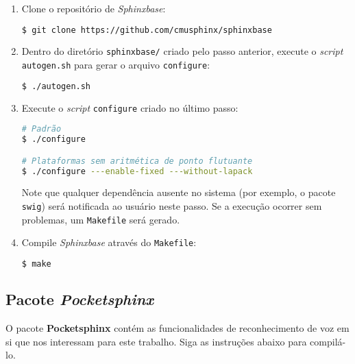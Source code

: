 \begin{enumerate}
\item Clone o repositório de \textit{Sphinxbase}:

\begin{lstlisting}[language=Bash]
$ git clone https://github.com/cmusphinx/sphinxbase
\end{lstlisting}

\item Dentro do diretório \texttt{sphinxbase/} criado pelo passo anterior, execute o \textit{script} \texttt{autogen.sh} para gerar o arquivo \texttt{configure}:

\begin{lstlisting}[language=Bash]
$ ./autogen.sh
\end{lstlisting}

\item Execute o \textit{script} \texttt{configure} criado no último passo:

\begin{lstlisting}[language=Bash]
# Padrão
$ ./configure

# Plataformas sem aritmética de ponto flutuante
$ ./configure ---enable-fixed ---without-lapack
\end{lstlisting}

Note que qualquer dependência ausente no sistema (por exemplo, o pacote \texttt{swig}) será notificada ao usuário neste passo. Se a execução ocorrer sem problemas, um \texttt{Makefile} será gerado.

\item Compile \textit{Sphinxbase} através do \texttt{Makefile}:

\begin{lstlisting}[language=Bash]
$ make
\end{lstlisting}

\end{enumerate}


\subsection{Pacote \textit{Pocketsphinx}}
\label{pocketsphinxCompile}

O pacote \textbf{Pocketsphinx} contém as funcionalidades de reconhecimento de voz em si que nos interessam para este trabalho. Siga as instruções abaixo para compilá-lo.

